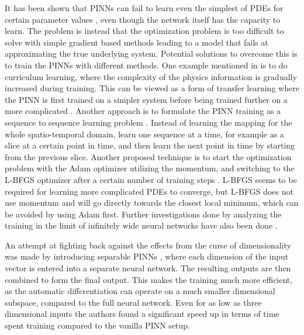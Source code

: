 It has been shown that PINNs can fail to learn even the simplest of PDEs for certain parameter values \cite{pinnfailuremodes}, even though the network itself has the capacity to learn. The problem is instead that the optimization problem is too difficult to solve with simple gradient based methods leading to a model that fails at approximating the true underlying system. Potential solutions to overcome this is to train the PINNs with different methods. One example mentioned in \cite{pinnfailuremodes} is to do curriculum learning, where the complexity of the physics information is gradually increased during training. This can be viewed as a form of transfer learning where the PINN is first trained on a simpler system before being trained further on a more complicated \cite{oldnewpinn}. Another approach is to formulate the PINN training as a sequence to sequence learning problem \cite{pinnfailuremodes}. Instead of learning the mapping for the whole spatio-temporal domain, learn one sequence at a time, for example as a slice at a certain point in time, and then learn the next point in time by starting from the previous slice. Another proposed technique is to start the optimization problem with the Adam optimizer utilizing the momentum, and switching to the L-BFGS optimizer after a certain number of training steps \cite{oldnewpinn}. L-BFGS seems to be required for learning more complicated PDEs to converge, but L-BFGS does not use momentum and will go directly towards the closest local minimum, which can be avoided by using Adam first. Further investigations done by analyzing the training in the limit of infinitely wide neural networks have also been done \cite{pinnfailtangentkernel}.

An attempt at fighting back against the effects from the curse of dimensionality was made by introducing separable PINNs \cite{separablepinn}, where each dimension of the input vector is entered into a separate neural network. The resulting outputs are then combined to form the final output. This makes the training much more efficient, as the automatic differentiation can operate on a much smaller dimensional subspace, compared to the full neural network. Even for as low as three dimensional inputs the authors found a significant speed up in terms of time spent training compared to the vanilla PINN setup.

